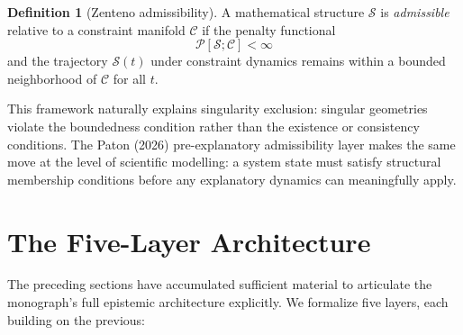 \documentclass[12pt, a4paper]{article}
\theoremstyle{plain}
\theoremstyle{definition}
\newtheorem{definition}[theorem]{Definition}
\theoremstyle{remark}
\begin{document}
\begin{definition}[Zenteno admissibility]
  A mathematical structure $\mathcal{S}$ is \emph{admissible} relative
  to a constraint manifold $\mathcal{C}$ if the penalty functional
  \[
    \mathcal{P}[\mathcal{S}; \mathcal{C}] < \infty
  \]
  and the trajectory $\mathcal{S}(t)$ under constraint dynamics remains
  within a bounded neighborhood of $\mathcal{C}$ for all $t$.
\end{definition}

This framework naturally explains singularity exclusion:
singular geometries violate the boundedness condition rather than the
existence or consistency conditions.
The Paton (2026) pre-explanatory admissibility layer makes the same
move at the level of scientific modelling:
a system state must satisfy structural membership conditions before
any explanatory dynamics can meaningfully apply.

\section{The Five-Layer Architecture}
\label{sec:fivelayers}

The preceding sections have accumulated sufficient material to
articulate the monograph's full epistemic architecture explicitly.
We formalize five layers, each building on the previous:
\end{document}

